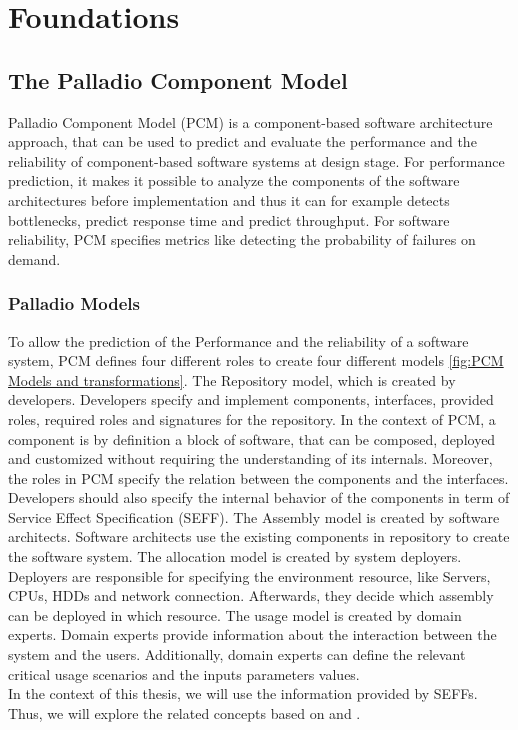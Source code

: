 

\chapter{Foundations}
\label{ch:Foundations}

\section{The Palladio Component Model}
\label{sec:The Palladio Component Model}
Palladio Component Model (PCM) is a component-based software architecture approach, that can be used to predict and evaluate the performance and the reliability of component-based software systems at design stage. For performance prediction, it makes it possible to analyze the components of the software architectures before implementation and thus it can for example detects bottlenecks, predict response time and predict throughput. For software reliability, PCM specifies metrics like detecting the probability of failures on demand. 

\subsection{Palladio Models}
\label{sec: Palladio Models}
To allow the prediction of the Performance and the reliability of a software system, PCM defines four different roles to create four different models \ref{fig:PCM Models and transformations}. The Repository model, which is created by developers. Developers specify and implement components, interfaces, provided roles, required roles and signatures for the repository. In the context of PCM, a component is by definition a block of software, that can be composed, deployed and customized without requiring the understanding of its internals.  Moreover, the roles in PCM specify the relation between the components and the interfaces. Developers should also specify the internal behavior of the components in term of Service Effect Specification (SEFF). The Assembly model is created by software architects. Software architects use the existing components in repository to create the software system. The allocation model is created by system deployers.  Deployers are responsible for specifying the environment resource, like Servers, CPUs, HDDs and network connection. Afterwards, they decide which assembly can be deployed in which resource. The usage model is created by domain experts. Domain experts provide information about the interaction between the system and the users. Additionally, domain experts can define the relevant critical usage scenarios and the inputs parameters values. \\
In the context of this thesis, we will use the information provided by SEFFs. Thus, we will explore the related concepts based on \cite{becker2009palladio} and \cite{koziolek2006parameter}.

